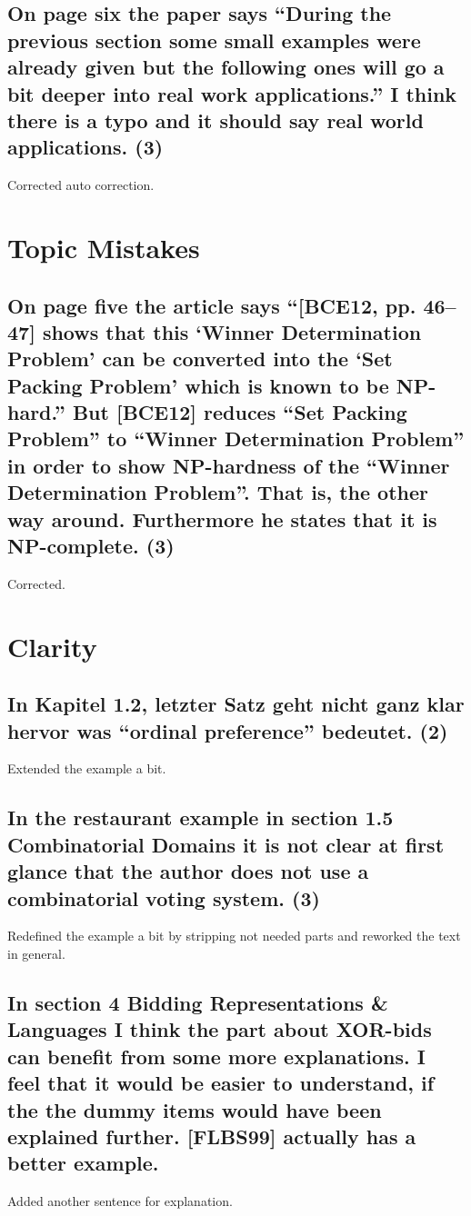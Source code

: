 \documentclass{"../../Datenanalyse/assignments/latex-brookesassignment/brookes-assignment"}
\begin{document}
\subsection{On page six the paper says ``During the previous section some small examples were already given but the following ones will go a bit deeper into real work applications.'' I think there is a typo and it should say real world applications. (3)}
Corrected auto correction.

\section{Topic Mistakes}
\subsection{On page five the article says ``[BCE12, pp. 46–47] shows that this `Winner Determination Problem' can be converted into the `Set Packing Problem' which is known to be NP-hard.'' But [BCE12] reduces ``Set Packing Problem'' to ``Winner Determination Problem'' in order to show NP-hardness of the ``Winner Determination Problem''. That is, the other way around. Furthermore he states that it is NP-complete. (3)}
Corrected.

\section{Clarity}
\subsection{In Kapitel 1.2, letzter Satz geht nicht ganz klar hervor was ``ordinal preference'' bedeutet. (2)}
Extended the example a bit.
\subsection{In the restaurant example in section 1.5 Combinatorial Domains it is not clear at first glance that the author does not use a combinatorial voting system. (3)}
Redefined the example a bit by stripping not needed parts and reworked the text in general.
\subsection{In section 4 Bidding Representations \& Languages I think the part about XOR-bids can benefit from some more explanations. I feel that it would be easier to understand, if the the dummy items would have been explained further. [FLBS99] actually has a better example.}
Added another sentence for explanation.
\end{document}
